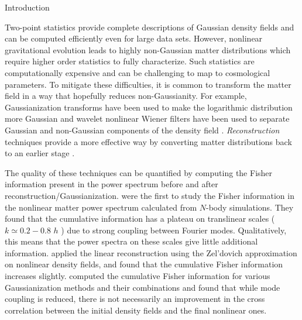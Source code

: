 \begin{section}{Introduction}\label{sec:introduction}  

  Two-point statistics provide complete descriptions of Gaussian
  density fields and can be computed efficiently even for large data
  sets.  However, nonlinear gravitational evolution leads to highly
  non-Gaussian matter distributions which require higher order
  statistics to fully characterize.  Such statistics are
  computationally expensive and can be challenging to map to
  cosmological parameters.  To mitigate these difficulties, it is
  common to transform the matter field in a way that hopefully reduces
  non-Gaussianity.  For example, Gaussianization transforms have been
  used to make the logarithmic distribution more Gaussian
  \citep{bib:Weinberg1992,bib:Mark2009} and wavelet nonlinear Wiener
  filters have been used to separate Gaussian and non-Gaussian
  components of the density field
  \citep{bib:Zhang2011,bib:Yu2012,bib:HarnoisD2013}.
  {\it Reconstruction} techniques  provide a more
  effective way by converting matter distributions back to an
  earlier stage \citep{bib:HarnoisD2013}.

  The quality of these techniques can be quantified by computing the Fisher
  information \citep{bib:Rimes2006} present in the power spectrum before and after
  reconstruction/Gaussianization.
  \citet{bib:Martin1999} were the first to study the Fisher information in the nonlinear
  matter power spectrum calculated from $N$-body simulations.  They
  found that the cumulative information has a plateau on translinear scales
  ($k \simeq 0.2-0.8$ $h$ ) due to strong coupling between Fourier
  modes.  Qualitatively, this means that the power spectra on these
  scales give little additional information.  
  \citet{bib:Ngan2012} applied the linear reconstruction using the Zel'dovich approximation 
  on nonlinear density fields, and found that the cumulative Fisher information increases slightly.
  \citet{bib:HarnoisD2013} computed the cumulative Fisher information
  for various Gaussianization methods and their combinations
  and found that while mode coupling is reduced, there is not
  necessarily an improvement in the cross correlation between the
  initial density fields and the final nonlinear ones. 


\end{section}
